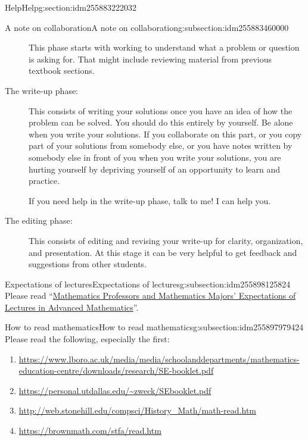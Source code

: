 \documentclass[oneside,10pt,]{article}
\begin{document}
\begin{sectionptx}{Help}{}{Help}{}{}{g:section:idm255883222032}
\begin{subsectionptx}{A note on collaboration}{}{A note on collaboration}{}{}{g:subsection:idm255883460000}
\begin{description}
\par
This phase starts with working to understand what a problem or question is asking for. That might include reviewing material from previous textbook sections.%
\item[{The write-up phase:}]This consists of writing your solutions once you have an idea of how the problem can be solved. You should do this entirely by yourself. Be alone when you write your solutions. If you collaborate on this part, or you copy part of your solutions from somebody else, or you have notes written by somebody else in front of you when you write your solutions, you are hurting yourself by depriving yourself of an opportunity to learn and practice. %
\par
If you need help in the write-up phase, talk to me! I can help you.%
\item[{The editing phase:}]This consists of editing and revising your write-up for clarity, organization, and presentation. At this stage it can be very helpful to get feedback and suggestions from other students.%
\end{description}
%
\end{subsectionptx}
%
%
\typeout{************************************************}
\typeout{************************************************}
%
\begin{subsectionptx}{Expectations of lectures}{}{Expectations of lectures}{}{}{g:subsection:idm255898125824}
Please read ``\href{http://blogs.ams.org/matheducation/2015/02/10/}{Mathematics Professors and Mathematics Majors' Expectations of Lectures in Advanced Mathematics}''.%
\end{subsectionptx}
%
%
\typeout{************************************************}
\typeout{************************************************}
%
\begin{subsectionptx}{How to read mathematics}{}{How to read mathematics}{}{}{g:subsection:idm255897979424}
Please read the following, especially the first:%
\begin{enumerate}
\item{}\url{https://www.lboro.ac.uk/media/media/schoolanddepartments/mathematics-education-centre/downloads/research/SE-booklet.pdf}%
\item{}\url{https://personal.utdallas.edu/\~zweck/SEbooklet.pdf}%
\item{}\url{http://web.stonehill.edu/compsci/History_Math/math-read.htm}%
\item{}\url{https://brownmath.com/stfa/read.htm}%
\end{enumerate}
%
\end{subsectionptx}
\end{sectionptx}
\end{document}
